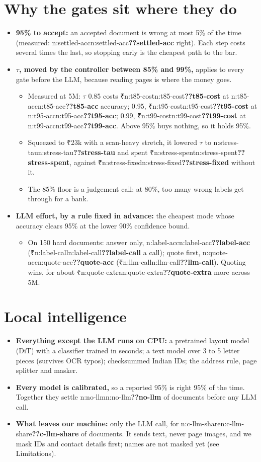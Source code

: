 \documentclass[9pt]{extarticle}
\newcommand\N[1]{\ifcsname n:#1\endcsname\csname n:#1\endcsname\else\textbf{??#1}\fi}
\newcommand\R{₹}
\begin{document}
\section{Why the gates sit where they do}
\begin{itemize}
\item \textbf{95\% to accept:} an accepted document is wrong at most 5\% of the time (measured: \N{settled-acc} right). Each step costs several times the last, so stopping early is the cheapest path to the bar.
\item \textbf{$\tau$, moved by the controller between 85\% and 99\%,} applies to every gate before the LLM, because reading pages is where the money goes.
  \begin{itemize}
  \item Measured at 5M: $\tau$ 0.85 costs \R\N{t85-cost} at \N{t85-acc} accuracy; 0.95, \R\N{t95-cost} at \N{t95-acc}; 0.99, \R\N{t99-cost} at \N{t99-acc}. Above 95\% buys nothing, so it holds 95\%.
  \item Squeezed to \R23k with a scan-heavy stretch, it lowered $\tau$ to \N{stress-tau} and spent \R\N{stress-spent}, against \R\N{stress-fixed} without it.
  \item The 85\% floor is a judgement call: at 80\%, too many wrong labels get through for a bank.
  \end{itemize}
\item \textbf{LLM effort, by a rule fixed in advance:} the cheapest mode whose accuracy clears 95\% at the lower 90\% confidence bound.
  \begin{itemize}
  \item On 150 hard documents: answer only, \N{label-acc} (\R\N{label-call} a call); quote first, \N{quote-acc} (\R\N{llm-call}). Quoting wins, for about \R\N{quote-extra} more across 5M.
  \end{itemize}
\end{itemize}

\section{Local intelligence}
\begin{itemize}
\item \textbf{Everything except the LLM runs on CPU:} a pretrained layout model (DiT) with a classifier trained in seconds; a text model over 3 to 5 letter pieces (survives OCR typos); checksummed Indian IDs; the address rule, page splitter and masker.
\item \textbf{Every model is calibrated,} so a reported 95\% is right 95\% of the time. Together they settle \N{no-llm} of documents before any LLM call.
\item \textbf{What leaves our machine:} only the LLM call, for \N{c-llm-share} of documents. It sends text, never page images, and we mask IDs and contact details first; names are not masked yet (see Limitations).
\end{itemize}
\end{document}
